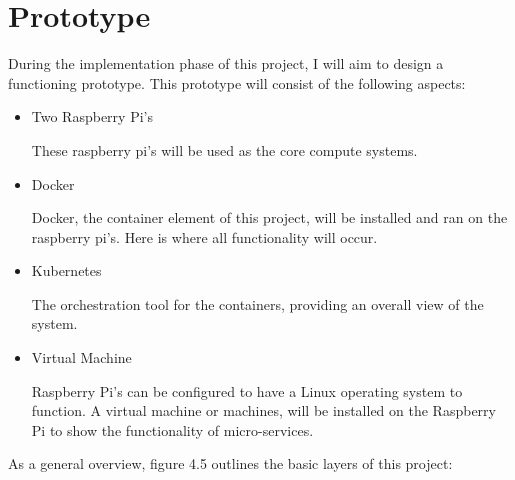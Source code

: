 \section{Prototype}
During the implementation phase of this project, I will aim to design a functioning prototype. This prototype will consist of the following aspects:
\begin{itemize}
    \item Two Raspberry Pi's
    
    These raspberry pi's will be used as the core compute systems. 
    
    \item Docker
    
    Docker, the container element of this project, will be installed and ran on the raspberry pi's. Here is where all functionality will occur.
    
    \item Kubernetes
    
    The orchestration tool for the containers, providing an overall view of the system.
    
    \item Virtual Machine
    
   Raspberry Pi's can be configured to have a Linux operating system to function. A virtual machine or machines, will be installed on the Raspberry Pi to show the functionality of micro-services.  
    
\end{itemize}

\pagebreak
As a general overview, figure 4.5 outlines the basic layers of this project:

